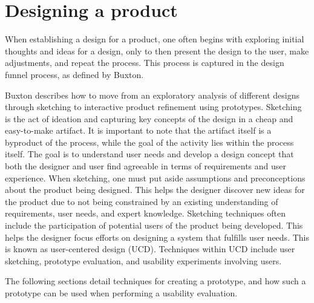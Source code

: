 \section{Designing a product} %
When establishing a design for a product, one often begins with exploring initial thoughts and ideas for a design, only to then present the design to the user, make adjustments, and repeat the process. 
This process is captured in the design funnel process, as defined by Buxton\cite{BUXTON2007135_skething}.

Buxton\cite{BUXTON2007135_skething,BUXTON2007139_prototyping} describes how to move from an exploratory analysis of different designs through sketching to interactive product refinement using prototypes. 
Sketching is the act of ideation and capturing key concepts of the design in a cheap and easy-to-make artifact. 
It is important to note that the artifact itself is a byproduct of the process, while the goal of the activity lies within the process itself.\cite{BUXTON2007135_skething}
The goal is to understand user needs and develop a design concept that both the designer and user find agreeable in terms of requirements and user experience. 
When sketching, one must put aside assumptions and preconceptions about the product being designed.
This helps the designer discover new ideas for the product due to not being constrained by an existing understanding of requirements, user needs, and expert knowledge.
Sketching techniques often include the participation of potential users of the product being developed.
This helps the designer focus efforts on designing a system that fulfills user needs.
This is known as user-centered design (UCD). \cite{user-centred-design}
Techniques within UCD include user sketching, prototype evaluation, and usability experiments involving users.

The following sections detail techniques for creating a prototype, and how such a prototype can be used when performing a usability evaluation.